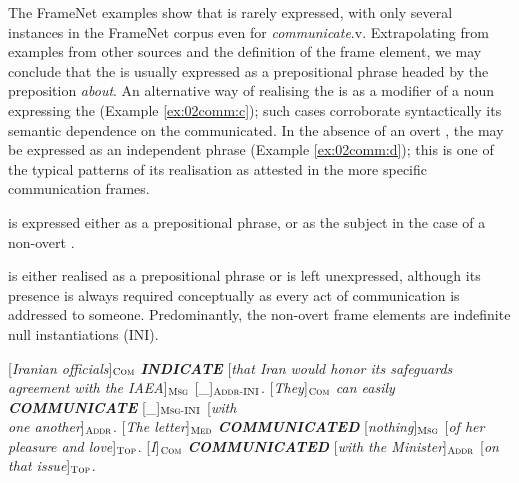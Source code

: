 \documentclass[output=paper,colorlinks,citecolor=brown]{langscibook}
\begin{document}
The FrameNet examples show that  is rarely expressed, with only several instances in the FrameNet corpus even for \textit{communicate}.v. Extrapolating from examples from other sources and the definition of the frame element, we may conclude that the  is usually expressed as a prepositional phrase headed by the preposition \textit{about}. An alternative way of realising the  is as a modifier of a noun expressing the  (Example \ref{ex:02comm:c}); such cases corroborate syntactically its semantic dependence on the  communicated. In the absence of an overt , the  may be expressed as an independent phrase (Example \ref{ex:02comm:d}); this is one of the typical patterns of its realisation as attested in the more specific communication frames.

 is expressed either as a prepositional phrase, or as the subject in the case of a non-overt .

 is either realised as a prepositional phrase or is left unexpressed, although its presence is always required conceptually as every act of communication is addressed to someone. Predominantly, the non-overt  frame elements are indefinite null instantiations (INI).



\begin{exe}
\ex \label{ex:02comm}
\begin{xlist}
\ex  \label{ex:02comm:a}
{[\textit{Iranian officials}]}$_{\text{\textsc{Com}}}$ \textit{\textbf{INDICATE}} [\textit{that Iran would honor its safeguards agreement with the IAEA}]$_{\text{\textsc{Msg}}}$ [\_]$_{\text{\textsc{Addr-INI}}}$.
\ex \label{ex:02comm:b}
{[\textit{They}]}$_{\text{\textsc{Com}}}$ \textit{can easily \textbf{COMMUNICATE}} [\_]$_{\text{\textsc{Msg-INI}}}$ [\textit{with \\one another}]$_{\text{\textsc{Addr}}}$.
\ex \label{ex:02comm:c}
{[\textit{The letter}]}$_{\text{\textsc{Med}}}$ \textit{\textbf{COMMUNICATED}} [\textit{nothing}]$_{\text{\textsc{Msg}}}$ [\textit{of her \\pleasure and love}]$_{\text{\textsc{Top}}}$.
\ex \label{ex:02comm:d}
{[\textit{I}]}$_{\text{\textsc{Com}}}$ \textit{\textbf{COMMUNICATED}} [\textit{with the Minister}]$_{\text{\textsc{Addr}}}$ [\textit{on \\that issue}]$_{\text{\textsc{Top}}}$.
\end{xlist}
\end{exe}
\end{document}

